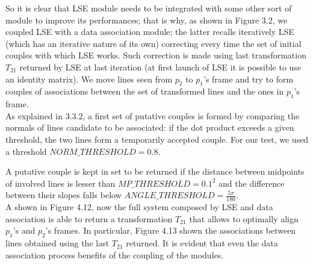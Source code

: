 \documentclass[a4paper, onecolumn]{report}
\begin{document}
So it is clear that LSE module needs to be integrated with some other sort of module to improve its performances; that is why, as shown in Figure 3.2, we coupled LSE with a data association module; the latter recalls iteratively LSE (which has an iterative nature of its own) correcting every time the set of initial couples with which LSE works. Such correction is made using last transformation $T_{21}$ returned by LSE at last iteration (at first launch of LSE it is possible to use an identity matrix). We move lines seen from $p_2$ to $p_1$'s frame and try to form couples of associations between the set of transformed lines and the ones in $p_1$'s frame. \\
As explained in 3.3.2, a first set of putative couples is formed by comparing the normals of lines candidate to be associated: if the dot product exceeds a given threshold, the two lines form a temporarily accepted couple. For our test, we used a threshold $NORM\_THRESHOLD = 0.8$.

A putative couple is kept in set to be returned if the distance between midpoints of involved lines is lesser than $MP\_THRESHOLD = 0.1^2$ and the difference between their slopes falls below $ANGLE\_THRESHOLD = \frac{5\pi}{180}$. \\
A shown in Figure 4.12, now the full system composed by LSE and data association is able to return a transformation $T_{21}$ that allows to optimally align $p_1$'s and $p_2$'s frames. In particular, Figure 4.13 shown the associations between lines obtained using the last $T_{21}$ returned. It is evident that even the data association process benefits of the coupling of the modules.
\end{document}
